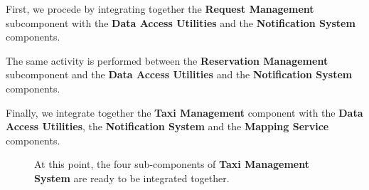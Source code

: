First, we procede by integrating together the \textbf{Request Management} subcomponent with the \textbf{Data Access Utilities} and the \textbf{Notification System} components.
\begin{figure}[H]
\centering
{}
\end{figure}
The same activity is performed between the \textbf{Reservation Management} subcomponent and the \textbf{Data Access Utilities} and the \textbf{Notification System} components.
\begin{figure}[H]
\centering
{}
\end{figure}
Finally, we integrate together the \textbf{Taxi Management} component with the \textbf{Data Access Utilities}, the \textbf{Notification System} and the \textbf{Mapping Service} components.
\begin{figure}[H]
\centering
{}
\end{figure}
\begin{figure}[H]
\centering
At this point, the four sub-components of \textbf{Taxi Management System} are ready to be integrated together. 
\end{figure}

